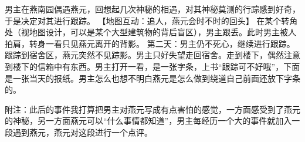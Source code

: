 男主在燕南园偶遇燕元，回想起几次神秘的相遇，对其神秘莫测的行踪感到好奇，于是决定对其进行跟踪。
【地图互动：追人，燕元会时不时的回头】
在某个转角处（视地图设计，可以是某个大型建筑物的背后盲区），男主跟丢。此时男主被人拍肩，转身一看只见燕元离开的背影。
第二天：男主仍不死心，继续进行跟踪。跟踪到宿舍区，燕元突然不见踪影。男主只好失望走回宿舍。走到楼下，偶然注意到楼下的信箱中有东西。男主打开一看，是一张字条，上书“跟踪可不好哦”，下面是一张当天的报纸。男主怎么也想不明白燕元是怎么做到绕道自己前面还放下字条的。

附注：此后的事件我打算把男主对燕元写成有点害怕的感觉，一方面感受到了燕元的神秘，另一方面燕元可以“什么事情都知道”，男主每经历一个大的事件就加入一段遇到燕元，燕元对这段进行一个点评。
